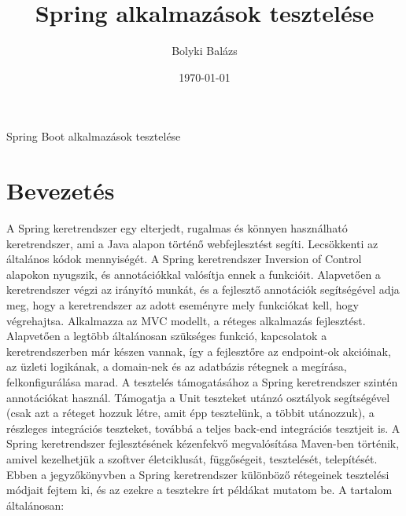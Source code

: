 \documentclass[a4paper, 12 pt]{article}
\title{Spring alkalmazások tesztelése}
\date{\today}
\author{Bolyki Balázs}
\begin{document}
\maketitle
\newpage
\tableofcontents
\newpage
{}
Spring Boot alkalmazások tesztelése

\section{Bevezetés} \label{sec_intro}
A Spring keretrendszer egy elterjedt, rugalmas és könnyen használható keretrendszer, 
ami a Java alapon történő webfejlesztést segíti. Lecsökkenti az általános kódok mennyiségét.
A Spring keretrendszer Inversion of Control alapokon nyugszik, és annotációkkal valósítja ennek
a funkcióit. Alapvetően a keretrendszer végzi az irányító munkát, és a fejlesztő annotációk 
segítségével adja meg, hogy a keretrendszer az adott eseményre mely funkciókat kell, hogy végrehajtsa. 
Alkalmazza az MVC modellt, a réteges alkalmazás fejlesztést. Alapvetően a legtöbb általánosan szükséges funkció, kapcsolatok a keretrendszerben már készen vannak, így a fejlesztőre az endpoint-ok akcióinak, az üzleti logikának, a domain-nek és az adatbázis rétegnek a megírása, felkonfigurálása marad.
A tesztelés támogatásához a Spring keretrendszer szintén annotációkat használ. Támogatja a Unit 
teszteket utánzó osztályok segítségével (csak azt a réteget hozzuk létre, amit épp tesztelünk, a többit utánozzuk), a részleges integrációs teszteket, továbbá a teljes back-end integrációs tesztjeit is.
A Spring keretrendszer fejlesztésének kézenfekvő megvalósítása Maven-ben történik, amivel kezelhetjük a szoftver életciklusát, függőségeit, tesztelését, telepítését.
Ebben a jegyzőkönyvben a Spring keretrendszer különböző rétegeinek tesztelési módjait fejtem ki, és az ezekre a tesztekre írt példákat mutatom be. A tartalom általánosan:
\end{document}
